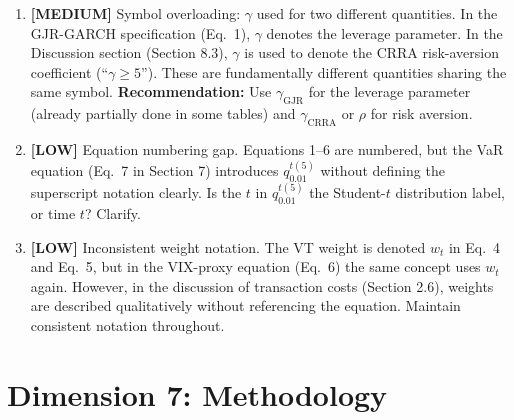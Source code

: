 \documentclass[12pt,a4paper]{article}
\newcommand{\MEDIUM}[1]{\textcolor{warncolor}{\textbf{[MEDIUM]} #1}}
\newcommand{\LOW}[1]{\textcolor{infocolor}{\textbf{[LOW]} #1}}
\begin{document}
\begin{enumerate}[leftmargin=2em]

\item \MEDIUM{Symbol overloading: $\gamma$ used for two different quantities.} In the GJR-GARCH specification (Eq.~1), $\gamma$ denotes the leverage parameter. In the Discussion section (Section 8.3), $\gamma$ is used to denote the CRRA risk-aversion coefficient (``$\gamma \geq 5$''). These are fundamentally different quantities sharing the same symbol. \textbf{Recommendation:} Use $\gamma_{\text{GJR}}$ for the leverage parameter (already partially done in some tables) and $\gamma_{\text{CRRA}}$ or $\rho$ for risk aversion.

\item \LOW{Equation numbering gap.} Equations 1--6 are numbered, but the VaR equation (Eq.~7 in Section 7) introduces $q_{0.01}^{t(5)}$ without defining the superscript notation clearly. Is the $t$ in $q_{0.01}^{t(5)}$ the Student-$t$ distribution label, or time $t$? Clarify.

\item \LOW{Inconsistent weight notation.} The VT weight is denoted $w_t$ in Eq.~4 and Eq.~5, but in the VIX-proxy equation (Eq.~6) the same concept uses $w_t$ again. However, in the discussion of transaction costs (Section 2.6), weights are described qualitatively without referencing the equation. Maintain consistent notation throughout.

\end{enumerate}

\section{Dimension 7: Methodology}
\end{document}

